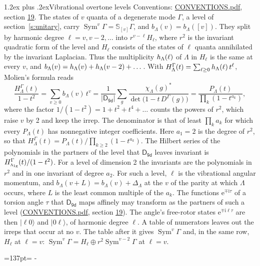 \documentclass[10pt,a4paper]{article}
\makeatletter
\renewcommand\section{\@startsection{section}{1}{\z@}{-3ex plus -1ex minus -.2ex}%
  {1.2ex plus .2ex}{\normalfont\large\sffamily\bfseries\color{parttitle}}}
\newcommand{\needspace}[1]{\par\penalty-100\begingroup\dimen0=#1\relax\dimen2=\pagegoal
  \advance\dimen2-\pagetotal\ifdim\dimen0>\dimen2\relax\ifdim\dimen2>0pt\vfil\break\fi\fi
  \endgroup}
\numberwithin{equation}{section}
\newcommand{\grp}[1]{\mathsf{#1}}
\newcommand{\irr}[1]{\text{\normalfont\scshape #1}}
\newcommand{\ptag}[1]{\mathrm{#1}}
\newcommand{\iunit}{\mathrm{i}}
\newcommand{\expe}{\mathrm{e}}
\newcommand{\repD}[1]{D^{#1}}
\newcommand{\irchar}[1]{\chi_{#1}}
\newcommand{\conj}[1]{{#1}^{*}}
\newcommand{\schur}[1]{\mathbb{S}_{#1}}
\newcommand{\shape}[1]{[#1]}
\newcommand{\occ}[1]{\lvert #1\rangle}
\makeatother
\begin{document}
\section{Vibrational overtone levels}\label{s:overtones}
Conventions: \href{../../CONVENTIONS.pdf}{CONVENTIONS.pdf}, section \href{../../CONVENTIONS.pdf\#conv.19}{19}.
\leavevmode\label{n:index.quanta}\label{n:operator.symmetric.power}The states of $v$ quanta of a degenerate mode $\Gamma$, a level of section~\ref{s:unitary}, carry $\operatorname{Sym}^{v}\Gamma = \schur{\shape{v}}\Gamma$, and $b_\Lambda(v) = b_\Lambda(\shape{v})$. \label{n:local.quadratic.form}\label{n:set.harmonic}They split by harmonic degree $\ell = v, v - 2, \dots$ into $r^{v-\ell}H_\ell$, where $r^2$ is the invariant quadratic form of the level and $H_\ell$ consists of the states of $\ell$ quanta annihilated by the invariant Laplacian. \label{n:function.multiplicity.harmonic}Thus the multiplicity $\mathnormal{h}_\Lambda(\ell)$ of $\Lambda$ in $H_\ell$ is the same at every $v$, and $b_\Lambda(v) = \mathnormal{h}_\Lambda(v) + \mathnormal{h}_\Lambda(v - 2) + \dots$. \label{n:function.generating.level}With $H^{\Gamma}_\Lambda(t) = \sum_{\ell\ge0} \mathnormal{h}_\Lambda(\ell)\,t^{\ell}$, Molien's formula reads
\begin{equation}\label{e:molien}\frac{H^{\Gamma}_\Lambda(t)}{1 - t^2} = \sum_{v\ge0} b_\Lambda(v)\,t^v = \frac{1}{|\grp{D_{9d}}|}\sum_{g}\frac{\conj{\irchar{\Lambda}(g)}}{\det\bigl(1 - t\,\repD{\Gamma}(g)\bigr)} = \frac{P_\Lambda(t)}{\prod_k (1-t^{a_k})},\end{equation}
where the factor $1/(1 - t^2) = 1 + t^2 + t^4 + \dots$ counts the powers of $r^2$, which raise $v$ by 2 and keep the irrep. The denominator is that of least $\prod_k a_k$ for which every $P_\Lambda(t)$ has nonnegative integer coefficients. Here $a_1 = 2$ is the degree of $r^2$, so that $H^{\Gamma}_\Lambda(t) = P_\Lambda(t)/\prod_{k\ge2}(1 - t^{a_k})$. The Hilbert series of the polynomials in the partners of the level that $\grp{D_{9d}}$ leaves invariant is $H^{\Gamma}_{\irr{a}_{1\ptag{g}}}(t)/(1 - t^2)$. For a level of dimension 2 the invariants are the polynomials in $r^2$ and in one invariant of degree $a_2$. \label{n:index.overtone.period}\label{n:index.increment.unitary}For such a level, $\ell$ is the vibrational angular momentum, and $b_\Lambda(v + L) = b_\Lambda(v) + \Delta_\Lambda$ at the $v$ of the parity at which $\Lambda$ occurs, where $L$ is the least common multiple of the $a_k$. \label{n:local.torsion.angle}The functions $\expe^{\mp\iunit\tau}$ of a torsion angle $\tau$ that $\grp{D_{9d}}$ maps affinely may transform as the partners of such a level (\href{../../CONVENTIONS.pdf}{CONVENTIONS.pdf}, section \href{../../CONVENTIONS.pdf\#conv.19}{19}). The angle's free-rotor states $\expe^{\mp\iunit\ell\tau}$ are then $\occ{\ell 0}$ and $\occ{0 \ell}$, of harmonic degree $\ell$. A table of numerators leaves out the irreps that occur at no $v$. The table after it gives $\operatorname{Sym}^{v}\Gamma$ and, in the same row, $H_\ell$ at $\ell = v$: $\operatorname{Sym}^{v}\Gamma = H_\ell \oplus r^2\operatorname{Sym}^{v-2}\Gamma$ at $\ell = v$.
\needspace{137pt}
\end{document}
